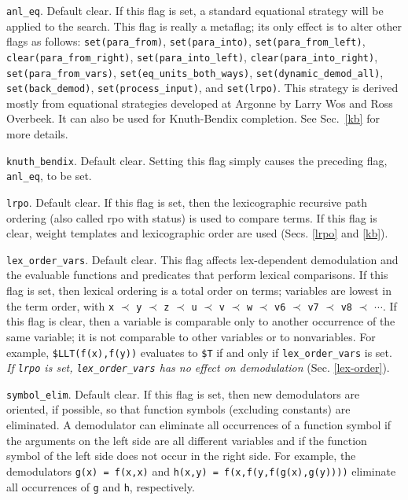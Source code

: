 \documentclass[11pt]{article}
\begin{document}
\noindent
\verb:anl_eq:.  Default clear.
If this flag is set, a standard equational strategy will be
applied to the search.
This flag is really a metaflag; its only effect is
to alter other flags as follows:
{\small
\verb:set(para_from):,
\verb:set(para_into):,
\verb:set(para_from_left):,
\verb:clear(para_from_right):,
\verb:set(para_into_left):,
\verb:clear(para_into_right):,
\verb:set(para_from_vars):,
\verb:set(eq_units_both_ways):,
\verb:set(dynamic_demod_all):,
\verb:set(back_demod):,
\verb:set(process_input):, and
\verb:set(lrpo):}.
This strategy is derived mostly from equational strategies
developed at Argonne by Larry Wos and Ross Overbeek.
It can also be used for Knuth-Bendix completion.
See Sec.~\ref{kb} for more details.

\noindent
\verb:knuth_bendix:.  Default clear.  Setting this flag
simply causes the preceding flag, \verb:anl_eq:, to be set.

\noindent
\verb:lrpo:.  Default clear.  If this flag is set, then the
lexicographic recursive path ordering (also called {\sc rpo} with
status) is used to compare terms.  If this flag is clear, weight
templates and lexicographic order are used (Secs. \ref{lrpo}
and \ref{kb}).

\noindent
\verb:lex_order_vars:.  Default clear.  This flag affects
lex-dependent demodulation and the evaluable functions and predicates
that perform lexical comparisons.  If this flag is set, then lexical
ordering is a total order on terms; variables are lowest in the term
order, with \verb:x: $\prec$ \verb:y: $\prec$ \verb:z: $\prec$ \verb:u:
$\prec$ \verb:v: $\prec$ \verb:w: $\prec$ \verb:v6: $\prec$ \verb:v7:
$\prec$ \verb:v8: $\prec$ $\cdots$.  If this flag is clear, then a
variable is comparable only to another occurrence of the same
variable; it is not comparable to other variables or to nonvariables.
For example, \verb:$LLT(f(x),f(y)): evaluates to \verb:$T: if and only
if \verb:lex_order_vars: is set.  {\it If \verb:lrpo: is set,
\verb:lex_order_vars: has no effect on demodulation}  (Sec.
\ref{lex-order}).

\noindent
\verb:symbol_elim:.  Default clear.  If this flag is set, then
new demodulators are oriented, if possible, so that function symbols
(excluding constants) are eliminated.  A demodulator can eliminate all
occurrences of a function symbol if the arguments on the left side are
all different variables and if the function symbol of the left side does
not occur in the right side.  For example, the demodulators
\verb:g(x) = f(x,x): and \verb:h(x,y) = f(x,f(y,f(g(x),g(y)))): eliminate all
occurrences of \verb:g: and \verb:h:, respectively.
\end{document}
